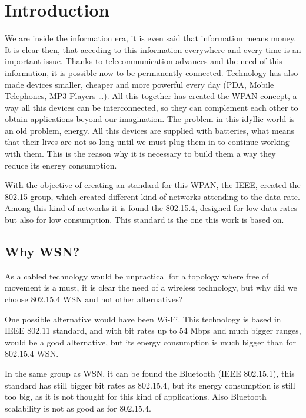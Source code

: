 \chapter{Introduction}
\label{chap:introduction}

We are inside the information era, it is even said that information means money. It is clear then, that acceding to this information
everywhere and every time is an important issue. Thanks to telecommunication advances and the need of this information, it is
possible now to be permanently connected. Technology has also made devices smaller, cheaper and more powerful
every day (\ac{PDA}, Mobile Telephones, \ac{MP3} Players \ldots). All this together has created the \ac{WPAN} concept, a way 
all this devices can be interconnected, so they can complement each other to obtain applications beyond our imagination. The 
problem in this idyllic world is an old problem, energy. All this devices are supplied with batteries, what means that their 
lives are not so long until we must plug them in to continue working with them. This is the reason why it is necessary to build them
a way they reduce its energy consumption.

With the objective of creating an standard for this \ac{WPAN}, the \ac{IEEE}, created the 802.15 group, which created different 
kind of networks attending to the data rate. Among this kind of networks it is found the 802.15.4, designed for low data rates but 
also for low consumption. This standard is the one this work is based on.

\section{Why \ac{WSN}?}

As a cabled technology would be unpractical for a topology where free of movement is a must, it is clear the need of a 
wireless technology, but why did we choose 802.15.4 \ac{WSN} and not other alternatives?

One possible alternative would have been Wi-Fi. This technology is based in \ac{IEEE} 802.11 standard, and with bit rates up to
54 Mbps and much bigger ranges, would be a good alternative, but its energy consumption is much bigger than for 802.15.4 \ac{WSN}.

In the same group as \ac{WSN}, it can be found the Bluetooth (\ac{IEEE} 802.15.1), this standard has still bigger bit rates as 
802.15.4, but its energy consumption is still too big, as it is not thought for this kind of applications. Also Bluetooth scalability
is not as good as for 802.15.4.

